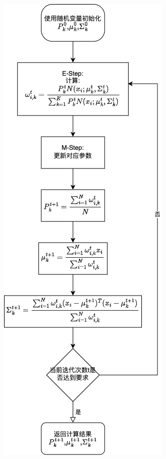 \documentclass[UTF8]{article} %
\begin{document}
    \begin{minipage}[t]{0.5\linewidth}
        \centering
        \includegraphics[width=\linewidth]{GMM-EM算法更新流程图.drawio}
    \end{minipage}
\end{document}
